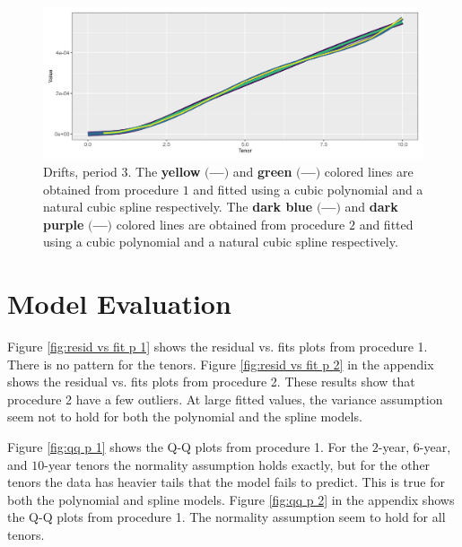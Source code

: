 \begin{figure}[!htbp]
    \centering
    \includegraphics[width=.95\linewidth]{Figures/Drifts/zero_coupon_yields_phase_3_HJM_2F_small_drifts_plot.png}
    
    \caption[Drifts, period 3]{Drifts, period 3. The \textbf{yellow} $\bigl($\textcolor{yellow_}{\textbf{---}}$\bigr)$ and \textbf{green} $\bigl($\textcolor{green_}{\textbf{---}}$\bigr)$ colored lines are obtained from procedure $1$ and fitted using a cubic polynomial and a natural cubic spline respectively. The \textbf{dark blue} $\bigl($\textcolor{dark_blue_1}{\textbf{---}}$\bigr)$ and \textbf{dark purple} $\bigl($\textcolor{dark_purple_}{\textbf{---}}$\bigr)$ colored lines are obtained from procedure $2$ and fitted using a cubic polynomial and a natural cubic spline respectively.}
    \label{fig:drifts period 3}
\end{figure}



\section{Model Evaluation}

\noindent Figure \ref{fig:resid vs fit p 1} shows the residual vs. fits plots from procedure 1. There is no pattern for the tenors. Figure \ref{fig:resid vs fit p 2} in the appendix shows the residual vs. fits plots from procedure 2. These results show that procedure 2 have a few outliers. At large fitted values, the variance assumption seem not to hold for both the polynomial and the spline models.

Figure \ref{fig:qq p 1} shows the Q-Q plots from procedure 1. For the $2$-year, $6$-year, and $10$-year tenors the normality assumption holds exactly, but for the other tenors the data has heavier tails that the model fails to predict. This is true for both the polynomial and spline models. Figure \ref{fig:qq p 2} in the appendix shows the Q-Q plots from procedure 1. The normality assumption seem to hold for all tenors.

